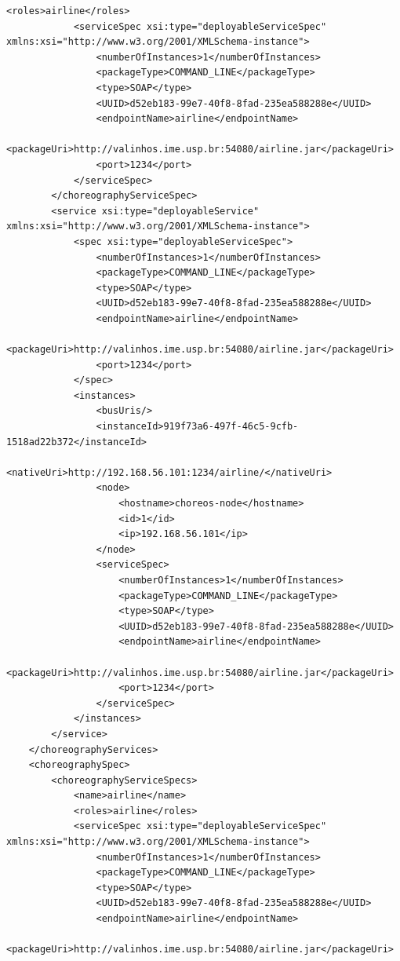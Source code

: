 \documentclass[a4paper, 10pt]{article}
\begin{document}
{\begin{lstlisting}[caption=Choreography XML representation example, label=lst:chor_xml]
            <roles>airline</roles>
            <serviceSpec xsi:type="deployableServiceSpec" 
xmlns:xsi="http://www.w3.org/2001/XMLSchema-instance">
                <numberOfInstances>1</numberOfInstances>
                <packageType>COMMAND_LINE</packageType>
                <type>SOAP</type>
                <UUID>d52eb183-99e7-40f8-8fad-235ea588288e</UUID>
                <endpointName>airline</endpointName>
                <packageUri>http://valinhos.ime.usp.br:54080/airline.jar</packageUri>
                <port>1234</port>
            </serviceSpec>
        </choreographyServiceSpec>
        <service xsi:type="deployableService" 
xmlns:xsi="http://www.w3.org/2001/XMLSchema-instance">
            <spec xsi:type="deployableServiceSpec">
                <numberOfInstances>1</numberOfInstances>
                <packageType>COMMAND_LINE</packageType>
                <type>SOAP</type>
                <UUID>d52eb183-99e7-40f8-8fad-235ea588288e</UUID>
                <endpointName>airline</endpointName>
                <packageUri>http://valinhos.ime.usp.br:54080/airline.jar</packageUri>
                <port>1234</port>
            </spec>
            <instances>
                <busUris/>
                <instanceId>919f73a6-497f-46c5-9cfb-1518ad22b372</instanceId>
                <nativeUri>http://192.168.56.101:1234/airline/</nativeUri>
                <node>
                    <hostname>choreos-node</hostname>
                    <id>1</id>
                    <ip>192.168.56.101</ip>
                </node>
                <serviceSpec>
                    <numberOfInstances>1</numberOfInstances>
                    <packageType>COMMAND_LINE</packageType>
                    <type>SOAP</type>
                    <UUID>d52eb183-99e7-40f8-8fad-235ea588288e</UUID>
                    <endpointName>airline</endpointName>
                    <packageUri>http://valinhos.ime.usp.br:54080/airline.jar</packageUri>
                    <port>1234</port>
                </serviceSpec>
            </instances>
        </service>
    </choreographyServices>
    <choreographySpec>
        <choreographyServiceSpecs>
            <name>airline</name>
            <roles>airline</roles>
            <serviceSpec xsi:type="deployableServiceSpec" 
xmlns:xsi="http://www.w3.org/2001/XMLSchema-instance">
                <numberOfInstances>1</numberOfInstances>
                <packageType>COMMAND_LINE</packageType>
                <type>SOAP</type>
                <UUID>d52eb183-99e7-40f8-8fad-235ea588288e</UUID>
                <endpointName>airline</endpointName>
                <packageUri>http://valinhos.ime.usp.br:54080/airline.jar</packageUri>

\end{lstlisting}}
\end{document}
